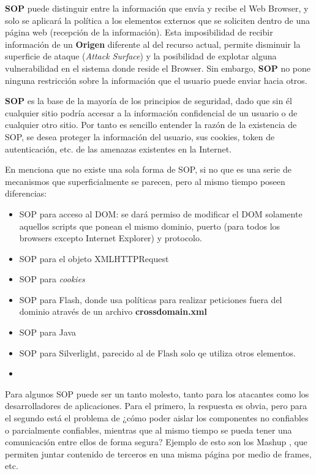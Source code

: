     \textbf{SOP} puede distinguir entre la información que envía y recibe el Web Browser, y solo se aplicará la política a los elementos externos que se soliciten dentro de una página web (recepción de la información). Esta imposibilidad de recibir información de un \textbf{Origen} diferente al del recurso actual, permite disminuir la superficie de ataque (\textit{Attack Surface}) y la posibilidad de explotar alguna vulnerabilidad en el sistema donde reside el Browser. Sin embargo, \textbf{SOP} no pone ninguna restricción sobre la información que el usuario puede enviar hacia otros. 

    \textbf{SOP} es la base de la mayoría de los principios de seguridad, dado que sin él cualquier sitio podría accesar a la información confidencial de un usuario o de cualquier otro sitio. Por tanto es sencillo entender la razón de la existencia de SOP, se desea proteger la información del usuario, sus cookies, token de autenticación, etc. de las amenazas existentes en la Internet.


    En \cite{Zalewsk08} menciona que no existe una sola forma de SOP, si no que es una serie de mecanismos que superficialmente se parecen, pero al mismo tiempo poseen diferencias:

    \begin{itemize}
        \item SOP para acceso al DOM: se dará permiso de modificar el DOM solamente aquellos scripts que ponean el mismo dominio, puerto (para todos los browsers excepto Internet Explorer) y protocolo.
        \item SOP para el objeto XMLHTTPRequest
        \item SOP para \textit{cookies}
        \item SOP para Flash, donde usa políticas para realizar peticiones fuera del dominio através de un archivo \textbf{crossdomain.xml}
        \item SOP para Java
        \item SOP para Silverlight, parecido al de Flash solo qe utiliza otros elementos.
        \item 
    \end{itemize}

        
    Para algunos SOP puede ser un tanto molesto, tanto para los atacantes como los desarrolladores de aplicaciones. Para el primero, la respuesta es obvia, pero para el segundo está el problema de ¿cómo poder aislar los componentes no confiables o parcialmente confiables, mientras que al mismo tiempo se pueda tener una comunicación entre ellos de forma segura? Ejemplo de esto son los Mashup \cite{barth2009securing}, que permiten juntar contenido de terceros en una misma página por medio de frames, etc. 
        
